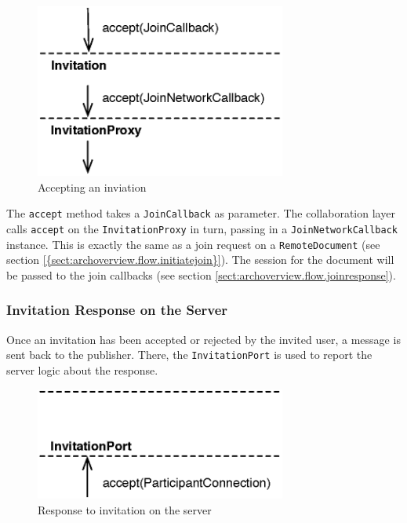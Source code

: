 \begin{figure}[H]
 \centering
 \includegraphics[width=8.26cm,height=5.72cm]{../images/finalreport/architecture_flows/invite_accept.eps}
 \caption{Accepting an inviation}
 \label{fig:archoverview.flow.inviteaccept}
\end{figure}

The \texttt{accept} method takes a \texttt{JoinCallback} as parameter. The
collaboration layer calls \texttt{accept} on the \texttt{InvitationProxy}
in turn, passing in a \texttt{JoinNetworkCallback} instance. This is
exactly the same as a join request on a \texttt{RemoteDocument} (see
section \ref{{sect:archoverview.flow.initiatejoin}}). The session for the
document will be passed to the join callbacks (see section 
\ref{sect:archoverview.flow.joinresponse}).

\subsubsection{Invitation Response on the Server}
Once an invitation has been accepted or rejected by the invited user, a
message is sent back to the publisher. There, the \texttt{InvitationPort}
is used to report the server logic about the response.

\begin{figure}[H]
 \centering
 \includegraphics[width=8.26cm,height=3.70cm]{../images/finalreport/architecture_flows/invite_response.eps}
 \caption{Response to invitation on the server}
 \label{fig:archoverview.flow.inviteresponse}
\end{figure}

